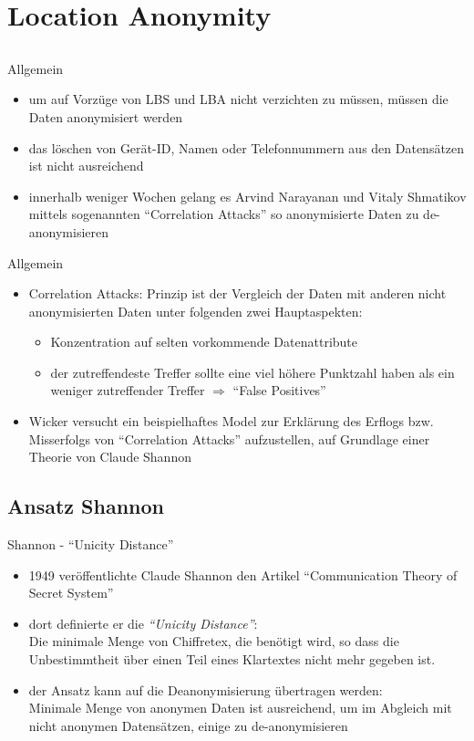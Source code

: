 \section{Location Anonymity}
\subsection{}
\begin{frame}{Allgemein}
\begin{itemize}
  \item um auf Vorzüge von LBS und LBA nicht verzichten zu müssen, müssen die Daten anonymisiert werden
  \item das löschen von Gerät-ID, Namen oder Telefonnummern aus den Datensätzen ist nicht ausreichend
  \item innerhalb weniger Wochen gelang es Arvind Narayanan und Vitaly Shmatikov mittels sogenannten "`Correlation Attacks"' so anonymisierte Daten zu de-anonymisieren
\end{itemize}
\end{frame}

\begin{frame}{Allgemein}
\begin{itemize}
  \item Correlation Attacks: Prinzip ist der Vergleich der Daten mit anderen nicht anonymisierten Daten unter folgenden zwei Hauptaspekten:
  \begin{itemize}
  \item Konzentration auf selten vorkommende Datenattribute
  \item der zutreffendeste Treffer sollte eine viel höhere Punktzahl haben als ein weniger zutreffender Treffer $\Rightarrow$ "`False Positives"'
  \end{itemize}
  \item Wicker versucht ein beispielhaftes Model zur Erklärung des Erflogs bzw. Misserfolgs von "`Correlation Attacks"' aufzustellen, auf Grundlage einer Theorie von Claude Shannon
\end{itemize}
\end{frame}

\subsection{Ansatz Shannon}
\begin{frame}{Shannon - "`Unicity Distance"'}
\begin{itemize}
  \item 1949 veröffentlichte Claude Shannon den Artikel "`Communication Theory of Secret System"'
  \item dort definierte er die \textit{"`Unicity Distance"'}:\\ Die minimale Menge von Chiffretex, die benötigt wird, so dass die Unbestimmtheit über einen Teil eines Klartextes nicht mehr gegeben ist.
  \item der Ansatz kann auf die Deanonymisierung übertragen werden:\\
  Minimale Menge von anonymen Daten ist ausreichend, um im Abgleich mit nicht anonymen Datensätzen, einige zu de-anonymisieren
\end{itemize}
\end{frame}

